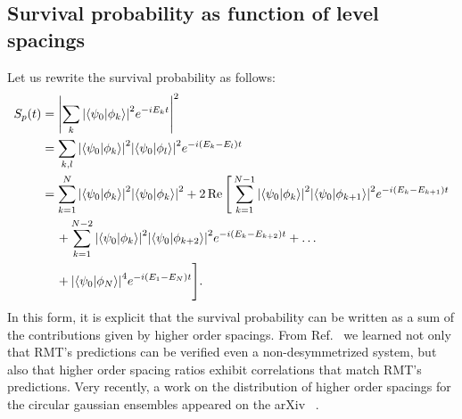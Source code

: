 \documentclass[10pt,a4paper]{article}
\begin{document}
\subsection{Survival probability as function of level spacings}
Let us rewrite the survival probability as follows:
\begin{align}
S_p(t) 
&= 
\abs{
\sum_{k}
\abs{\braket{\psi_0}{\phi_k}}^2
e^{-i E_k t}
}^2 
\\
%
&= 
\sum_{k,l}
\abs{\braket{\psi_0}{\phi_k}}^2
\abs{\braket{\psi_0}{\phi_l}}^2
e^{-i (E_k - E_l) t} \\
%
&= 
\sum_{k=1}^N
\abs{\braket{\psi_0}{\phi_k}}^2
\abs{\braket{\psi_0}{\phi_k}}^2
+ 2\Re\Bigg[
\sum_{k=1}^{N-1}
\abs{\braket{\psi_0}{\phi_k}}^2
\abs{\braket{\psi_0}{\phi_{k+1}}}^2
e^{-i (E_k - E_{k+1}) t} 
\nonumber \\
%
&\quad\, + 
\sum_{k=1}^{N-2}
\abs{\braket{\psi_0}{\phi_k}}^2
\abs{\braket{\psi_0}{\phi_{k+2}}}^2
e^{-i (E_k - E_{k+2}) t} 
+ \ldots
\nonumber \\
%
&\quad\, + 
\abs{\braket{\psi_0}{\phi_N}}^4
e^{-i (E_1 - E_N) t} \Bigg]. 
\label{eq:Sp:spacings}
\end{align}
In this form, it is explicit that the survival probability can be written
as a sum of the contributions given by higher order spacings. From 
Ref.~\cite{tekur_2020_symmetry} we learned not only that RMT's predictions
can be verified even a non-desymmetrized system, but also that higher 
order spacing ratios exhibit correlations that match RMT's predictions.
Very recently, a work on the distribution of higher order spacings
for the circular gaussian ensembles appeared on the 
arXiv~\cite{rout_2025_higherorder} 
.
\end{document}
